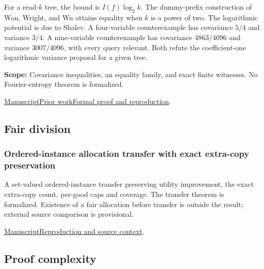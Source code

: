 \documentclass[11pt,a4paper]{article}
\begin{document}
For a read-$k$ tree, the bound is $I(f)\log_2 k$. The dummy-prefix construction of Wan, Wright, and Wu attains equality when $k$ is a power of two. The logarithmic potential is due to Shalev. A four-variable counterexample has covariance $5/4$ and variance $3/4$. A nine-variable counterexample has covariance $4863/4096$ and variance $3007/4096$, with every query relevant. Both refute the coefficient-one logarithmic variance proposal for a given tree.

\par\smallskip
\noindent\textbf{Scope:} Covariance inequalities, an equality family, and exact finite witnesses. No Fourier-entropy theorem is formalized.

\par\smallskip
\noindent\href{https://github.com/dvgyl/math-and-theory/blob/main/papers/theoretical-computer-science/readk-covariance/docs/manuscript.pdf}{Manuscript}\quad\href{https://github.com/dvgyl/math-and-theory/blob/main/papers/theoretical-computer-science/readk-covariance/docs/related-work.md}{Prior work}\quad\href{https://github.com/dvgyl/math-and-theory/blob/main/papers/theoretical-computer-science/readk-covariance/README.md}{Formal proof and reproduction}.

\subsection{Fair division}

\subsubsection{Ordered-instance allocation transfer with exact extra-copy preservation}

A set-valued ordered-instance transfer preserving utility improvement, the exact extra-copy count, per-good caps and coverage. The transfer theorem is formalized. Existence of a fair allocation before transfer is outside the result; external source comparison is provisional.

\href{https://github.com/dvgyl/math-and-theory/blob/main/papers/theoretical-computer-science/ordered-allocation/manuscript.pdf}{Manuscript}\quad\href{https://github.com/dvgyl/math-and-theory/blob/main/papers/theoretical-computer-science/ordered-allocation/README.md}{Reproduction and source context}.

\subsection{Proof complexity}
\end{document}
